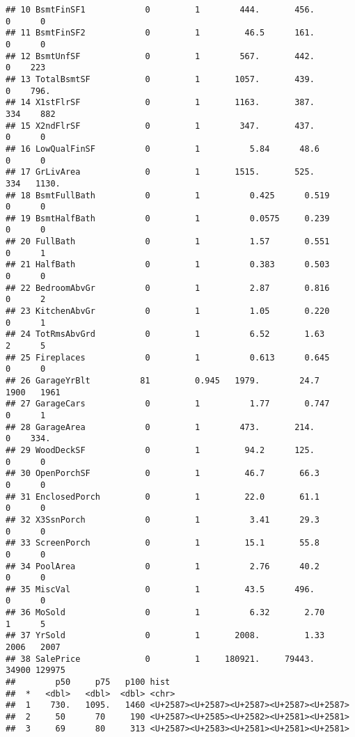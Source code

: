 \documentclass[
]{article}
\begin{document}
\begin{verbatim}
## 10 BsmtFinSF1            0         1        444.       456.        0      0 
## 11 BsmtFinSF2            0         1         46.5      161.        0      0 
## 12 BsmtUnfSF             0         1        567.       442.        0    223 
## 13 TotalBsmtSF           0         1       1057.       439.        0    796.
## 14 X1stFlrSF             0         1       1163.       387.      334    882 
## 15 X2ndFlrSF             0         1        347.       437.        0      0 
## 16 LowQualFinSF          0         1          5.84      48.6       0      0 
## 17 GrLivArea             0         1       1515.       525.      334   1130.
## 18 BsmtFullBath          0         1          0.425      0.519     0      0 
## 19 BsmtHalfBath          0         1          0.0575     0.239     0      0 
## 20 FullBath              0         1          1.57       0.551     0      1 
## 21 HalfBath              0         1          0.383      0.503     0      0 
## 22 BedroomAbvGr          0         1          2.87       0.816     0      2 
## 23 KitchenAbvGr          0         1          1.05       0.220     0      1 
## 24 TotRmsAbvGrd          0         1          6.52       1.63      2      5 
## 25 Fireplaces            0         1          0.613      0.645     0      0 
## 26 GarageYrBlt          81         0.945   1979.        24.7    1900   1961 
## 27 GarageCars            0         1          1.77       0.747     0      1 
## 28 GarageArea            0         1        473.       214.        0    334.
## 29 WoodDeckSF            0         1         94.2      125.        0      0 
## 30 OpenPorchSF           0         1         46.7       66.3       0      0 
## 31 EnclosedPorch         0         1         22.0       61.1       0      0 
## 32 X3SsnPorch            0         1          3.41      29.3       0      0 
## 33 ScreenPorch           0         1         15.1       55.8       0      0 
## 34 PoolArea              0         1          2.76      40.2       0      0 
## 35 MiscVal               0         1         43.5      496.        0      0 
## 36 MoSold                0         1          6.32       2.70      1      5 
## 37 YrSold                0         1       2008.         1.33   2006   2007 
## 38 SalePrice             0         1     180921.     79443.    34900 129975 
##        p50     p75   p100 hist 
##  *   <dbl>   <dbl>  <dbl> <chr>
##  1    730.   1095.   1460 <U+2587><U+2587><U+2587><U+2587><U+2587>
##  2     50      70     190 <U+2587><U+2585><U+2582><U+2581><U+2581>
##  3     69      80     313 <U+2587><U+2583><U+2581><U+2581><U+2581>

\end{verbatim}
\end{document}

